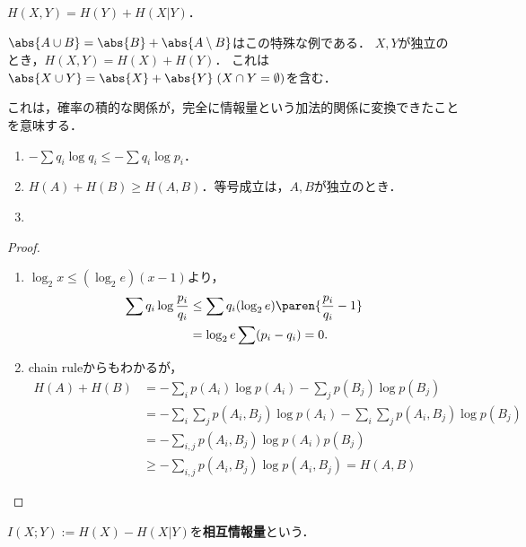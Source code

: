 \documentclass[uplatex,dvipdfmx]{jsreport}
\begin{document}
\begin{lemma}
    $H(X,Y)=H(Y)+H(X|Y)$．
\end{lemma}
\begin{remarks}
    $\abs{A\cup B}=\abs{B}+\abs{A\setminus B}$はこの特殊な例である．
    $X,Y$が独立のとき，$H(X,Y)=H(X)+H(Y)$．
    これは$\abs{X\cup Y}=\abs{X}+\abs{Y}\;(X\cap Y=\emptyset)$を含む．

    これは，確率の積的な関係が，完全に情報量という加法的関係に変換できたことを意味する．
\end{remarks}

\begin{lemma}\mbox{}
    \begin{enumerate}
        \item $-\sum q_i\log q_i\le-\sum q_i\log p_i$．
        \item $H(A)+H(B)\ge H(A,B)$．等号成立は，$A,B$が独立のとき．
        \item 
    \end{enumerate}
\end{lemma}
\begin{proof}\mbox{}
    \begin{enumerate}
        \item $\log_2x\le(\log_2e)(x-1)$より，
        \begin{align*}
            \sum q_i\log\frac{p_i}{q_i}&\le\sum q_i(\log_2e)\paren{\frac{p_i}{q_i}-1}\\
            &=\log_2e\sum(p_i-q_i)=0.
        \end{align*}
        \item chain ruleからもわかるが，
        \begin{align*}
            H(A)+H(B)&=-\sum_ip(A_i)\log p(A_i)-\sum_jp(B_j)\log p(B_j)\\
            &=-\sum_i\sum_jp(A_i,B_j)\log p(A_i)-\sum_i\sum_jp(A_i,B_j)\log p(B_j)\\
            &=-\sum_{i,j}p(A_i,B_j)\log p(A_i)p(B_j)\\
            &\ge-\sum_{i,j}p(A_i,B_j)\log p(A_i,B_j)=H(A,B)
        \end{align*}
    \end{enumerate}
\end{proof}

\begin{definition}
    $I(X;Y):=H(X)-H(X|Y)$を\textbf{相互情報量}という．
\end{definition}
\end{document}
